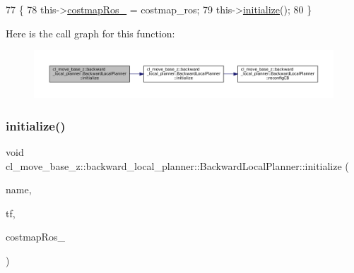 \begin{DoxyCode}
77         \{
78             this->\hyperlink{classcl__move__base__z_1_1backward__local__planner_1_1BackwardLocalPlanner_a4136268882a105d9e06e173d85d5c0dc}{costmapRos\_} = costmap\_ros;
79             this->\hyperlink{classcl__move__base__z_1_1backward__local__planner_1_1BackwardLocalPlanner_a5c9815019cef272faed835cd8c575196}{initialize}();
80         \}
\end{DoxyCode}
Here is the call graph for this function\+:
\nopagebreak
\begin{figure}[H]
\begin{center}
\leavevmode
\includegraphics[width=350pt]{classcl__move__base__z_1_1backward__local__planner_1_1BackwardLocalPlanner_ae7659aa099ce5a329a9ef046dabcc599_cgraph}
\end{center}
\end{figure}
\mbox{\label{classcl__move__base__z_1_1backward__local__planner_1_1BackwardLocalPlanner_a9a854ad7d93c5db2efda316358aa845c}} 
\subsubsection{\texorpdfstring{initialize()}{initialize()}\hspace{0.1cm}{\footnotesize\ttfamily [2/3]}}
{\footnotesize\ttfamily void cl\+\_\+move\+\_\+base\+\_\+z\+::backward\+\_\+local\+\_\+planner\+::\+Backward\+Local\+Planner\+::initialize (\begin{DoxyParamCaption}\item[{std\+::string}]{name,  }\item[{tf2\+\_\+ros\+::\+Buffer $\ast$}]{tf,  }\item[{costmap\+\_\+2d\+::\+Costmap2\+D\+R\+OS $\ast$}]{costmap\+Ros\+\_\+ }\end{DoxyParamCaption})}




